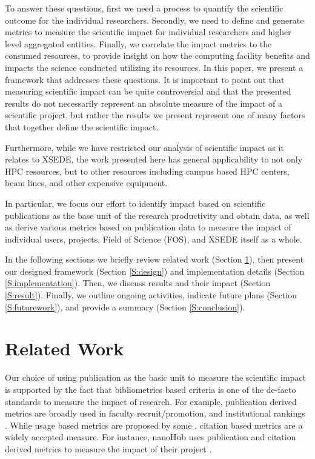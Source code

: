 \documentclass{sig-alternate}
\begin{document}
To answer these questions, first we need a process to quantify the scientific outcome for the individual researchers. Secondly, we need to define and generate metrics to measure the scientific impact for individual researchers and higher level aggregated entities. Finally, we correlate the impact metrics to the consumed resources, to provide insight on how the computing facility benefits and impacts the science conducted utilizing its resources. In this paper, we present a framework that addresses these questions. It is important to point out that measuring scientific impact can be quite controversial and that the presented results do not necessarily represent an absolute measure of the impact of a scientific project, but rather the results we present represent one of many factors that together define the scientific impact.

Furthermore, while we have restricted our analysis of scientific impact as it relates to XSEDE, the work presented here has general applicability to not only HPC resources, but to other resources including campus based HPC centers, beam lines, and other expensive equipment.

In particular, we focus our effort to identify impact based on scientific publications as the base unit of the research productivity and obtain data, as well as derive various metrics based on publication data to measure the impact of individual users, projects, Field of Science (FOS), and XSEDE itself as a whole.

In the following sections we briefly review related work (Section \ref{S:related}), then present our designed framework (Section \ref{S:design}) and implementation details (Section \ref{S:implementation}). Then, we discuss results and their impact (Section \ref{S:result}). Finally, we outline ongoing activities, indicate future plans (Section \ref{S:futurework}), and provide a summary (Section \ref{S:conclusion}).

\section{Related Work} \label{S:related}
Our choice of using publication as the basic unit to measure the scientific impact is supported by the fact that bibliometrics based criteria is one of the de-facto standards to measure the impact of research. For example, publication derived metrics are broadly used in faculty recruit/promotion, and institutional rankings \cite{thomas1998institutional}.  While usage based metrics are proposed by some \cite{Bollen:2007:MUM:1255175.1255273,Bollen:2008:TUI:1378889.1378928, bollen2009principal}, citation based metrics are a widely accepted measure. For instance, nanoHub uses publication and citation derived metrics to measure the impact of their project \cite{www-nanohubcite}.
\end{document}
